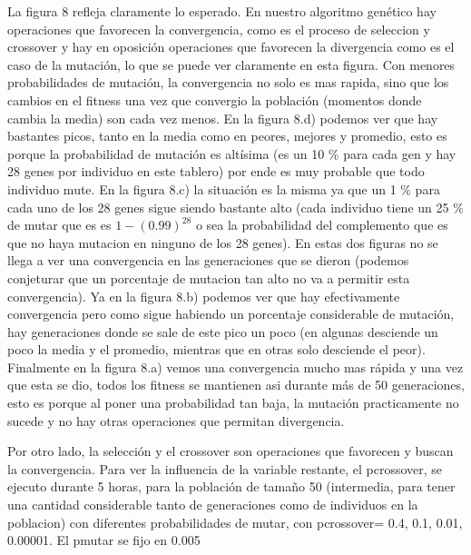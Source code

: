 \documentclass[A4paper,oneside,fleqn,11pt]{article}
\theoremstyle{definition}
\begin{document}
La figura 8 refleja claramente lo esperado. En nuestro algoritmo genético hay operaciones que favorecen la convergencia, como es el proceso de seleccion y crossover y hay en oposición operaciones que favorecen la divergencia como es el caso de la mutación, lo que se puede ver claramente en esta figura. Con menores probabilidades de mutación, la convergencia no solo es mas rapida, sino que los cambios en el fitness una vez que convergio la población (momentos donde cambia la media) son cada vez menos. En la figura 8.d) podemos ver que hay bastantes picos, tanto en la media como en peores, mejores y promedio, esto es porque la probabilidad de mutación es altísima (es un 10 \% para cada gen y hay 28 genes por individuo en este tablero) por ende es muy probable que todo individuo mute. En la figura 8.c) la situación es la misma ya que un 1 \% para cada uno de los 28 genes sigue siendo bastante alto (cada individuo tiene un 25 \% de mutar que es es $1- (0.99)^28$ o sea la probabilidad del complemento que es que no haya mutacion en ninguno de los 28 genes). En estas dos figuras no se llega a ver una convergencia en las generaciones que se dieron (podemos conjeturar que un porcentaje de mutacion tan alto no va a permitir esta convergencia). Ya en la figura 8.b) podemos ver que hay efectivamente convergencia pero como sigue habiendo un porcentaje considerable de mutación, hay generaciones donde se sale de este pico un poco (en algunas desciende un poco la media y el promedio, mientras que en otras solo desciende el peor). Finalmente en la figura 8.a) vemos una convergencia mucho mas rápida y una vez que esta se dio, todos los fitness se mantienen asi durante más de 50 generaciones, esto es porque al poner una probabilidad tan baja, la mutación practicamente no sucede y no hay otras operaciones que permitan divergencia.

Por otro lado, la selección y el crossover son operaciones que favorecen y buscan la convergencia. Para ver la influencia de la variable restante, el pcrossover, se ejecuto durante 5 horas,  para la población de tamaño 50 (intermedia, para tener una cantidad considerable tanto de generaciones como de individuos en la poblacion) con diferentes probabilidades de mutar, con pcrossover= 0.4, 0.1, 0.01, 0.00001.  El pmutar se fijo en 0.005
\end{document}
